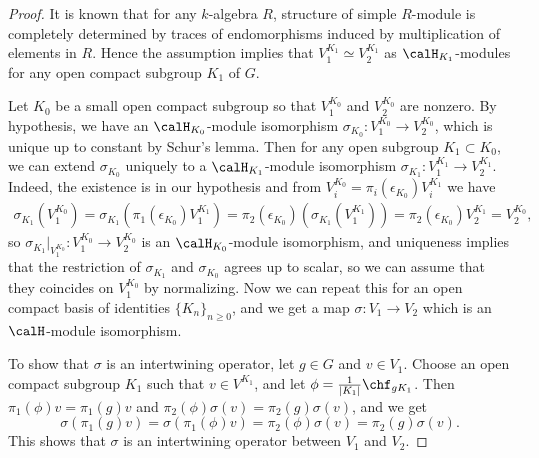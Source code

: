 \begin{proof}
It is known that for any $k$-algebra $R$, structure of simple $R$-module is completely determined by traces of endomorphisms induced by multiplication of elements in $R$. Hence the assumption implies that $V_{1}^{K_{1}}\simeq V_{2}^{K_{1}}$ as $\calH_{K_{1}}$-modules for any open compact subgroup $K_{1}$ of $G$. 

Let $K_{0}$ be a small open compact subgroup so that $V_{1}^{K_{0}}$ and $V_{2}^{K_{0}}$ are nonzero. 
By hypothesis, we have an  $\calH_{K_{0}}$-module isomorphism $\sigma_{K_{0}}:V_{1}^{K_{0}}\to V_{2}^{K_{0}}$, which is unique up to constant by Schur's lemma.  
Then for any open subgroup $K_{1} \subset K_{0}$, we can extend $\sigma_{K_{0}}$ uniquely to a $\calH_{K_{1}}$-module isomorphism $\sigma_{K_{1}}:V_{1}^{K_{1}}\to V_{2}^{K_{1}}$.
Indeed, the existence is in our hypothesis and from $V_{i}^{K_{0}} = \pi_{i}(\epsilon_{K_{0}}) V_{i}^{K_{1}}$ we have
\begin{align*}
\sigma_{K_{1}}(V_{1}^{K_{0}}) = \sigma_{K_{1}}(\pi_{1}(\epsilon_{K_{0}})V_{1}^{K_{1}}) = \pi_{2}(\epsilon_{K_{0}}) (\sigma_{K_{1}}(V_{1}^{K_{1}})) = \pi_{2}(\epsilon_{K_{0}}) V_{2}^{K_{1}} = V_{2}^{K_{0}},
\end{align*}
so $\sigma_{K_{1}}|_{V_{1}^{K_{0}}} : V_{1}^{K_{0}} \to V_{2}^{K_{0}}$ is an $\calH_{K_{0}}$-module isomorphism, and uniqueness implies that the restriction of $\sigma_{K_{1}}$ and $\sigma_{K_{0}}$ agrees up to scalar, so we can assume that they coincides on $V_{1}^{K_{0}}$ by normalizing. 
Now we can repeat this for an open compact basis of identities $\{K_{n}\}_{n\geq 0}$, and we get a map $\sigma:V_{1}\to V_{2}$ which is an $\calH$-module isomorphism. 

To show that $\sigma$ is an intertwining operator, let $g\in G$ and $v\in V_{1}$. Choose an open compact subgroup $K_{1}$ such that $v\in V^{K_{1}}$, and let $\phi = \frac{1}{|K_{1}|} \chf_{gK_{1}}$. 
Then $\pi_{1}(\phi)v = \pi_{1}(g)v$ and $\pi_{2}(\phi)\sigma(v)= \pi_{2}(g)\sigma(v)$, and we get
$$
\sigma(\pi_{1}(g)v) = \sigma(\pi_{1}(\phi)v) = \pi_{2}(\phi)\sigma(v) = \pi_{2}(g)\sigma(v). 
$$
This shows that $\sigma$ is an intertwining operator between $V_{1}$ and $V_{2}$. 
\end{proof}


